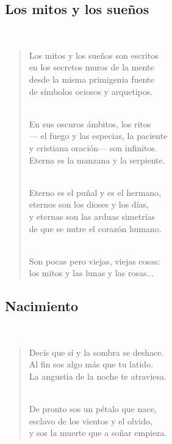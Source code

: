 \documentclass[a4paper, 12pt]{article}
\begin{document}
\pagebreak
\subsection{Los mitos y los sueños}
~ 

\begin{verse}
    
Los mitos y los sueños son escritos\\
en los secretos muros de la mente\\
desde la misma primigenia fuente\\
de símbolos ociosos y arquetipos.\\
~ 

En sus oscuros ámbitos, los ritos\\
— el fuego y las especias, la paciente\\
y cristiana oración— son infinitos.\\
Eterna es la manzana y la serpiente.\\
~ 

Eterno es el puñal y es el hermano,\\
eternos son los dioses y los días,\\
y eternas son las arduas simetrías\\
de que se nutre el corazón humano.\\
~ 

Son pocas pero viejas, viejas cosas:\\
los mitos y las lunas y las rosas...\\
\end{verse}

\pagebreak 

\subsection{Nacimiento}
~ 
\begin{verse}
    
Decís que sí y la sombra se deshace.\\
Al fin sos algo más que tu latido.\\
La angustia de la noche te atraviesa.\\
~ 

De pronto sos un pétalo que nace,\\
esclavo de los vientos y el olvido,\\
y sos la muerte que a soñar empieza.\\
\end{verse}
\end{document}
